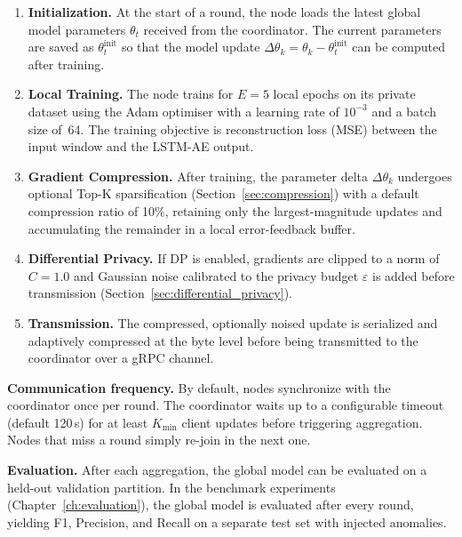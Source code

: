 \begin{enumerate}
    \item \textbf{Initialization.} At the start of a round, the node loads the
    latest global model parameters $\theta_t$ received from the coordinator.
    The current parameters are saved as $\theta_t^{\text{init}}$ so that the
    model update $\Delta\theta_k = \theta_k - \theta_t^{\text{init}}$ can be
    computed after training.

    \item \textbf{Local Training.} The node trains for $E=5$ local epochs on
    its private dataset using the Adam optimiser with a learning rate of
    $10^{-3}$ and a batch size of~64. The training objective is reconstruction
    loss (MSE) between the input window and the LSTM-AE output.

    \item \textbf{Gradient Compression.} After training, the parameter delta
    $\Delta\theta_k$ undergoes optional Top-K sparsification
    (Section~\ref{sec:compression}) with a default compression ratio of 10\%,
    retaining only the largest-magnitude updates and accumulating the remainder
    in a local error-feedback buffer.

    \item \textbf{Differential Privacy.} If DP is enabled, gradients are
    clipped to a norm of $C=1.0$ and Gaussian noise calibrated to the privacy
    budget $\varepsilon$ is added before transmission
    (Section~\ref{sec:differential_privacy}).

    \item \textbf{Transmission.} The compressed, optionally noised update is
    serialized and adaptively compressed at the byte level before being
    transmitted to the coordinator over a gRPC channel.
\end{enumerate}

\textbf{Communication frequency.} By default, nodes synchronize with the
coordinator once per round. The coordinator waits up to a configurable timeout
(default 120\,s) for at least $K_{\min}$ client updates before triggering
aggregation. Nodes that miss a round simply re-join in the next one.

\textbf{Evaluation.} After each aggregation, the global model can be evaluated
on a held-out validation partition. In the benchmark experiments
(Chapter~\ref{ch:evaluation}), the global model is evaluated after every round,
yielding F1, Precision, and Recall on a separate test set with injected
anomalies.

